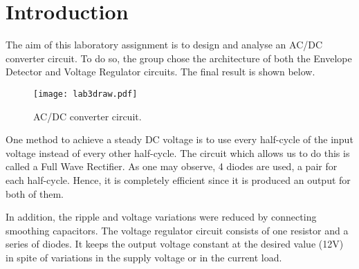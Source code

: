 \section{Introduction}
\label{introduction}



\par The aim of this laboratory assignment is to design and analyse an AC/DC converter circuit. To do so, the group chose the architecture of both the Envelope Detector and Voltage Regulator circuits. The final result is shown below.



\begin{figure}[ht] \centering
\texttt{[image: lab3draw.pdf]}
\caption{ AC/DC converter circuit.}
\label{AC/DC circuit.}
\end{figure}
\par 


One method to achieve a steady DC voltage is to use every half-cycle of the input voltage instead of every other half-cycle. The circuit which allows us to do this is called a Full Wave Rectifier. As one may observe, 4 diodes are used, a pair for each half-cycle. Hence, it is completely efficient since it is produced an output for both of them.

In addition, the ripple and voltage variations were reduced by connecting smoothing capacitors. The voltage regulator circuit consists of one resistor and a series of diodes. It keeps the output voltage constant at the desired value (12V) in spite of variations in the supply voltage or in the current load.



\newpage
